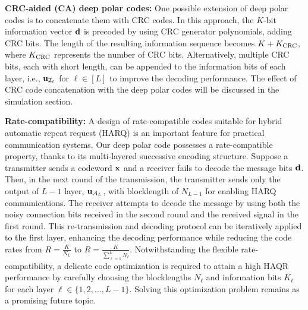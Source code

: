 \documentclass[conference]{IEEEtran}
\begin{document}
 




%






 {\vspace{0.1cm}}
 
 {\bf CRC-aided (CA) deep polar codes:} 
One possible extension of deep polar codes is to concatenate them with CRC codes. In this approach, the $K$-bit information vector ${\bf d}$ is precoded by using CRC generator polynomials, adding CRC bits. The length of the resulting information sequence becomes $K+K_{\rm CRC}$, where $K_{\rm CRC}$ represents the number of CRC bits. Alternatively, multiple CRC bits, each with short length, can be appended to the information bits of each layer, i.e., ${\bf u}_{\mathcal{I}_{\ell}}$ for $\ell\in [L]$ to improve the decoding performance. The effect of CRC code concatenation with the deep polar codes will be discussed in the simulation section. 
 
 
 {\vspace{0.1cm}}
 
 {\bf Rate-compatibility:} 
A design of rate-compatible codes suitable for hybrid automatic repeat request (HARQ) is an important feature for practical communication systems. Our deep polar code possesses a rate-compatible property, thanks to its multi-layered successive encoding structure. Suppose a transmitter sends a codeword ${\bf x}$ and a receiver fails to decode the message bits ${\bf d}$. Then, in the next round of the transmission, the transmitter sends only the output of $L-1$ layer, ${\bf u}_{\mathcal{A}_L}$, with blocklength of $N_{L-1}$ for enabling HARQ communications. The receiver attempts to decode the message by using both the noisy connection bits received in the second round and the received signal in the first round. This re-transmission and decoding protocol can be iteratively applied to the first layer, enhancing the decoding performance while reducing the code rates from $R=\frac{K}{N_L}$ to $R=\frac{K}{\sum_{\ell=1}^LN_{\ell}}$. Notwithstanding the flexible rate-compatibility, a delicate code optimization is required to 
attain a high HAQR performance by carefully choosing the blocklengths $N_{\ell}$ and information bits $K_{\ell}$ for each layer $\ell\in \{1,2,\ldots,L-1 \}$. Solving this optimization problem remains as a promising future topic.
\end{document}
